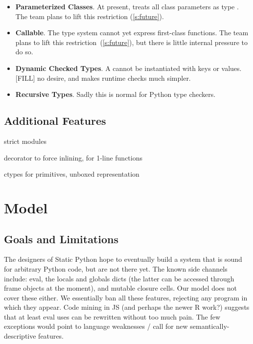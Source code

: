 \documentclass[a4paper,english,cleveref,autoref,thm-restate,anonymous,]{lipics-v2021}
\begin{document}
\begin{itemize}
  \item \textbf{Parameterized Classes}.
    At present, \SP{} treats all class parameters as type .
    The team plans to lift this restriction (\cref{s:future}).

  \item \textbf{Callable}.
    The type system cannot yet express first-class functions.
    The team plans to lift this restriction~(\cref{s:future}),
    but there is little internal pressure to do so.

  \item \textbf{Dynamic Checked Types}.
    A  cannot be instantiated with 
    keys or values.
    [FILL] no desire, and makes runtime checks much simpler.

  \item \textbf{Recursive Types}.
    Sadly this is normal for Python type checkers.

\end{itemize}


\subsection{Additional Features}

strict modules

decorator to force inlining, for 1-line functions

ctypes for primitives, unboxed representation


\section{Model}
\label{s:model}


\subsection{Goals and Limitations}

The designers of Static Python hope to eventually build a system that is sound for arbitrary Python code,
but are not there yet.
The known side channels include:
eval, the locals and globals dicts (the latter can be accessed through frame objects at the moment),
and mutable closure cells.
Our model does not cover these either.
We essentially ban all these features, rejecting any program in which they appear.
Code mining in JS (and perhaps the newer R work?) suggests that at least eval
uses can be rewritten without too much pain. The few exceptions would point
to language weaknesses / call for new semantically-descriptive features.
\end{document}
